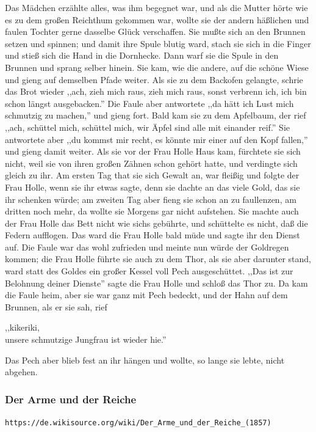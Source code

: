\documentclass[10pt,a4paper]{article}
\begin{document}
\vskip 4pt
Das Mädchen erzählte alles, was ihm begegnet war, und als die Mutter hörte wie
es zu dem großen Reichthum gekommen war, wollte sie der andern häßlichen und
faulen Tochter gerne dasselbe Glück verschaffen. Sie mußte sich an den Brunnen
setzen und spinnen; und damit ihre Spule blutig ward, stach sie sich in die
Finger und stieß sich die Hand in die Dornhecke. Dann warf sie die Spule in den
Brunnen und sprang selber hinein. Sie kam, wie die andere, auf die schöne Wiese
und gieng auf demselben Pfade weiter. Als sie zu dem Backofen gelangte, schrie
das Brot wieder ,,ach, zieh mich raus, zieh mich raus, sonst verbrenn ich, ich
bin schon längst ausgebacken.'' Die Faule aber antwortete ,,da hätt ich Lust
mich schmutzig zu machen,'' und gieng fort. Bald kam sie zu dem Apfelbaum, der
rief ,,ach, schüttel mich, schüttel mich, wir Äpfel sind alle mit einander reif.''
Sie antwortete aber ,,du kommst mir recht, es könnte mir einer auf den Kopf
fallen,'' und gieng damit weiter. Als sie vor der Frau Holle Haus kam, fürchtete
sie sich nicht, weil sie von ihren großen Zähnen schon gehört hatte, und
verdingte sich gleich zu ihr. Am ersten Tag that sie sich Gewalt an, war fleißig
und folgte der Frau Holle, wenn sie ihr etwas sagte, denn sie dachte an das
viele Gold, das sie ihr schenken würde; am zweiten Tag aber fieng sie schon an
zu faullenzen, am dritten noch mehr, da wollte sie Morgens gar nicht aufstehen.
Sie machte auch der Frau Holle das Bett nicht wie sichs gebührte, und schüttelte
es nicht, daß die Federn aufflogen. Das ward die Frau Holle bald müde und sagte
ihr den Dienst auf. Die Faule war das wohl zufrieden und meinte nun würde der
Goldregen kommen; die Frau Holle führte sie auch zu dem Thor, als sie aber
darunter stand, ward statt des Goldes ein großer Kessel voll Pech ausgeschüttet.
,,Das ist zur Belohnung deiner Dienste'' sagte die Frau Holle und schloß das
Thor zu. Da kam die Faule heim, aber sie war ganz mit Pech bedeckt, und der Hahn
auf dem Brunnen, als er sie sah, rief

\vskip 4pt
,,kikeriki, \\
unsere schmutzige Jungfrau ist wieder hie.''

\vskip 4pt
Das Pech aber blieb fest an ihr hängen und wollte, so lange sie lebte, nicht
abgehen.

\subsubsection{Der Arme und der Reiche}

\verb+https://de.wikisource.org/wiki/Der_Arme_und_der_Reiche_(1857)+
\end{document}
